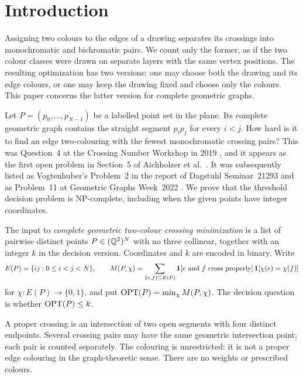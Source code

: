 \section{Introduction}\label{sec:introduction}

Assigning two colours to the edges of a drawing separates its crossings
into monochromatic and bichromatic pairs. We count only the former, as
if the two colour classes were drawn on separate layers with the same
vertex positions. The resulting optimization has two versions: one may
choose both the drawing and its edge colours, or one may keep the drawing
fixed and choose only the colours. This paper concerns the latter version
for complete geometric graphs.

Let $P=(p_0,\ldots,p_{N-1})$ be a labelled point set in the plane. Its
complete geometric graph contains the straight segment $p_ip_j$ for every
$i<j$. How hard is it to find an edge two-colouring with the fewest
monochromatic crossing pairs? This was Question~4 at the Crossing Number
Workshop in 2019 \cite[Section~1.4]{CRNW2019}, and it appears as the first
open problem in Section~5 of Aichholzer et al.\ \cite{Aichholzer2019}.
It was subsequently listed as Vogtenhuber's Problem~2 in the report of
Dagstuhl Seminar~21293 \cite[Section~4.12]{Dagstuhl2021} and as Problem~11
at Geometric Graphs Week~2022 \cite{GGWeek2022}. We prove that the threshold
decision problem is NP-complete, including when the given points have
integer coordinates.

\begin{definition}\label{def:problem}
The input to \emph{complete geometric two-colour crossing minimization}
is a list of pairwise distinct points $P\in(\mathbb Q^2)^N$ with no three
collinear, together with an integer $k$ in the decision version.
Coordinates and $k$ are encoded in binary. Write
\[
 E(P)=\{ij:0\leq i<j<N\},\qquad
 M(P,\chi)=\sum_{\{e,f\}\subseteq E(P)}
       \mathbf 1[e\text{ and }f\text{ cross properly}]\,\mathbf 1[\chi(e)=\chi(f)]
\]
for $\chi:E(P)\to\{0,1\}$, and put
$\operatorname{OPT}(P)=\min_\chi M(P,\chi)$.
The decision question is whether $\operatorname{OPT}(P)\leq k$.
\end{definition}

A proper crossing is an intersection of two open segments with four
distinct endpoints. Several crossing pairs may have the same geometric
intersection point; each pair is counted separately. The colouring is
unrestricted: it is not a proper edge colouring in the graph-theoretic
sense. There are no weights or prescribed colours.

